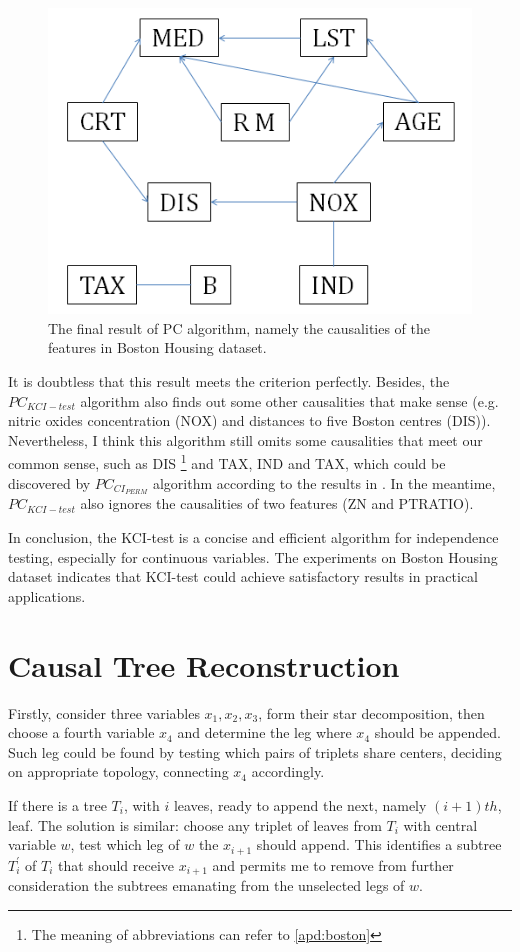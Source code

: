 \documentclass[12pt,a4paper]{article}
\theoremstyle{definition}
\begin{document}
\begin{figure}[H]
	\centering
	\includegraphics[width=0.55\linewidth]{img/res.png}
	\caption{The final result of PC algorithm, namely the causalities of the features in Boston Housing dataset.}
	\label{fig:pc-res}
\end{figure}

It is doubtless that this result meets the criterion perfectly. Besides, the $PC_{KCI-test}$ algorithm also finds out some other causalities that make sense (e.g. nitric oxides concentration (NOX) and distances to five Boston centres (DIS)). Nevertheless, I think this algorithm still omits some causalities that meet our common sense, such as DIS \footnote{The meaning of abbreviations can refer to \ref{apd:boston}} and TAX, IND and TAX, which could be discovered by $PC_{CI_{PERM}}$ algorithm according to the results in \cite{alg}. In the meantime, $PC_{KCI-test}$ also ignores the causalities of two features (ZN and PTRATIO). 

\vspace{0.008\linewidth}
In conclusion, the KCI-test is a concise and efficient algorithm for independence testing, especially for continuous variables. The experiments on Boston Housing dataset indicates that KCI-test could achieve satisfactory results in practical applications.

\section{Causal Tree Reconstruction}

Firstly, consider three variables $x_1, x_2, x_3$, form their star decomposition, then choose a fourth variable $x_4$ and determine the leg where $x_4$ should be appended. Such leg could be found by testing which pairs of triplets share centers, deciding on appropriate topology, connecting $x_4$ accordingly.

\vspace{0.008\linewidth}
If there is a tree $T_i$, with $i$ leaves, ready to append the next, namely $(i + 1)th$, leaf. The solution is similar: choose any triplet of leaves from $T_i$ with central variable $w$, test which leg of $w$ the $x_{i+1}$ should append. This identifies a subtree $T_i^{'}$ of $T_i$ that should receive $x_{i+1}$ and permits me to remove from further consideration the subtrees emanating from the unselected legs of $w$.
\end{document}
